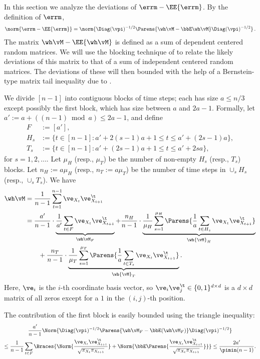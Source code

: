 In this section we analyze the deviations of $\errm-\EE{\errm}$. By the definition of $\errm$,
\begin{align}
\label{eq:errmdev1}
\norm{\errm-\EE{\errm}}
 =  \norm{\Diag(\vpi)^{-1/2}\Parens{\wh\vM - \bbE \wh\vM } \Diag(\vpi)^{-1/2}}
 \,.
\end{align}
The matrix $\wh\vM - \EE{\wh\vM}$  is defined 
as a sum of dependent centered random matrices.
We will use the blocking technique of \citet{Bernstein27} 
to relate the likely deviations of this matrix to that of
a sum of independent centered random matrices.
The deviations of these will then bounded
with the help of a Bernstein-type matrix tail inequality due to \citet{tropp2015intro}.

We divide $[n-1]$ into contiguous blocks of time steps; each has size
$a \leq n/3$ except possibly the first block, which has size between
$a$ and $2a-1$.
Formally, let $a' := a + ((n-1) \bmod a) \leq 2a-1$, and define
\begin{align*}
  F & := [a'] , \\
  H_s & := \{ t \in [n-1] : a' + 2(s-1)a + 1 \leq t \leq a' + (2s-1)a \} , \\
  T_s & := \{ t \in [n-1] : a' + (2s-1)a + 1 \leq t \leq a' + 2sa \} ,
\end{align*}
for $s=1,2,\dotsc$.
Let $\mu_H$ (resp., $\mu_T$) be the number of non-empty $H_s$ (resp., $T_s$)
blocks.
Let $n_H := a\mu_H$ (resp., $n_T := a\mu_T$) be the number of time
steps in $\cup_s H_s$ (resp., $\cup_s T_s$).
We have
\begin{align}
  \wh\vM
  & = \frac1{n-1} \sum_{t=1}^{n-1} \ve_{X_t} \ve_{X_{t+1}}^\t
  \notag \\
  & = \frac{a'}{n-1} \cdot
    \underbrace{
      \frac{1}{a'} \sum_{t\in F} \ve_{X_t} \ve_{X_{t+1}}^\t
     }_{\wh\vM_F} +
  \frac{n_H}{n-1} \cdot
  \underbrace{
    \frac1{\mu_H}
    \sum_{s=1}^{\mu_H}
    \Parens{
      \frac1a \sum_{t \in H_s} \ve_{X_t} \ve_{X_{t+1}}^\t
    }
  }_{\wh{\vM}_H}
  \notag \\
  & \qquad
  + \frac{n_T}{n-1} \cdot
  \underbrace{
    \frac1{\mu_T}
    \sum_{s=1}^{\mu_T}
    \Parens{
      \frac1a \sum_{t \in T_s} \ve_{X_t} \ve_{X_{t+1}}^\t
    }
  }_{\wh{\vM}_T}
  .
  \label{eq:blocking}
\end{align}
Here, $\ve_i$ is the $i$-th coordinate basis vector, so $\ve_i
\ve_j^\t \in \{0,1\}^{d \times d}$ is a $d \times d$ matrix of all
zeros except for a $1$ in the $(i,j)$-th position.

The contribution of the first block is easily bounded using the
triangle inequality:
\begin{multline}
  \frac{a'}{n-1}
  \Norm{
    \Diag(\vpi)^{-1/2}
    \Parens{
      \wh\vM_F - \bbE(\wh\vM_F)
    }
    \Diag(\vpi)^{-1/2}
  }
  \\
  \leq
  \frac1{n-1} \sum_{t \in F}
  \Braces{
    \Norm{
      \frac{
        \ve_{X_t} \ve_{X_{t+1}}^\t
      }{\sqrt{\pi_{X_t}\pi_{X_{t+1}}}}
    }
    +
    \Norm{
      \bbE\Parens{
        \frac{
          \ve_{X_t} \ve_{X_{t+1}}^\t
        }{\sqrt{\pi_{X_t}\pi_{X_{t+1}}}}
      }
    }
  }
  \leq
  \frac{2a'}{\pimin(n-1)}
  .
  \label{eq:first-block}
\end{multline}

